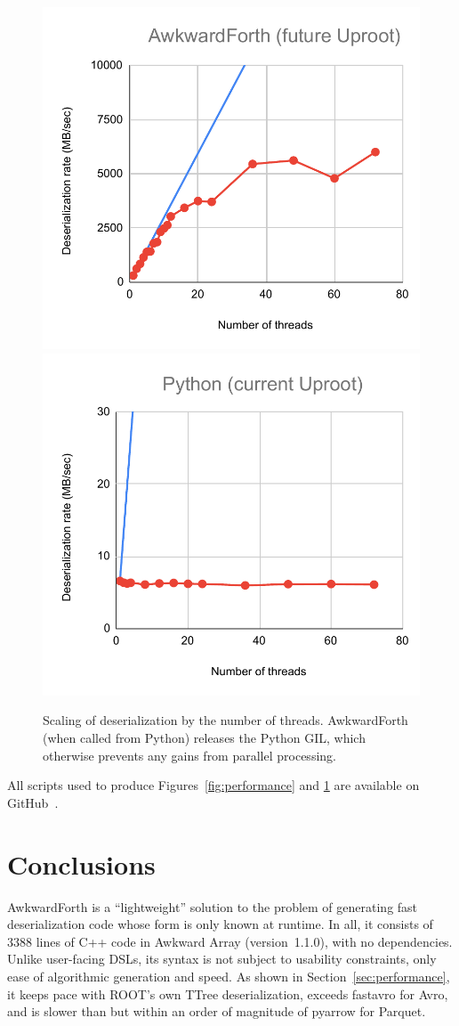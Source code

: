 \documentclass{webofc}
\begin{document}
\begin{figure}[t]
\includegraphics[width=0.5\linewidth]{AwkwardForth-scaling.pdf}
\includegraphics[width=0.5\linewidth]{Python-scaling.pdf}

\caption{Scaling of deserialization by the number of threads. AwkwardForth (when called from Python) releases the Python GIL, which otherwise prevents any gains from parallel processing. \label{fig:scaling}}
\end{figure}

All scripts used to produce Figures~\ref{fig:performance} and \ref{fig:scaling} are available on GitHub~\cite{this-study}.

\section{Conclusions}

AwkwardForth is a ``lightweight'' solution to the problem of generating fast deserialization code whose form is only known at runtime. In all, it consists of 3388 lines of C++ code in Awkward Array (version~1.1.0), with no dependencies. Unlike user-facing DSLs, its syntax is not subject to usability constraints, only ease of algorithmic generation and speed. As shown in Section~\ref{sec:performance}, it keeps pace with ROOT's own TTree deserialization, exceeds fastavro for Avro, and is slower than but within an order of magnitude of pyarrow for Parquet.
\end{document}
